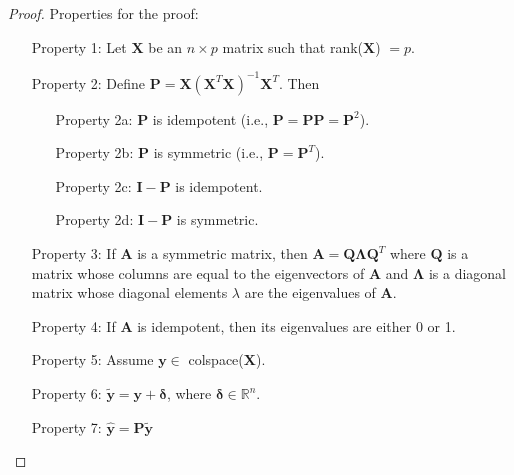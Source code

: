 \documentclass{umassthesis}          %
\begin{document}
\begin{proof}
Properties for the proof:
\begin{enumerate}
\item[Property 1:] Let $\boldsymbol{X}$ be an $n \times p$ matrix such that rank($\boldsymbol{X}$) $= p$.
\item[Property 2:] Define $\boldsymbol{P} = \boldsymbol{X}(\boldsymbol{X}^T\boldsymbol{X})^{-1}\boldsymbol{X}^T$. Then
\begin{enumerate}
\item[Property 2a:] $\boldsymbol{P}$ is idempotent (i.e., $\boldsymbol{P} = \boldsymbol{P} \boldsymbol{P} = \boldsymbol{P}^2$).
\item[Property 2b:] $\boldsymbol{P}$ is symmetric (i.e., $\boldsymbol{P} = \boldsymbol{P}^T$).
\item[Property 2c:] $\boldsymbol{I-P}$ is idempotent.
\item[Property 2d:] $\boldsymbol{I-P}$ is symmetric.
\end{enumerate}
\item[Property 3:] If $\boldsymbol{A}$ is a symmetric matrix, then $\boldsymbol{A} = \boldsymbol{Q} \boldsymbol{\Lambda} \boldsymbol{Q}^T$ where $\boldsymbol{Q}$ is a matrix whose columns are equal to the eigenvectors of $\boldsymbol{A}$ and $\boldsymbol{\Lambda}$ is a diagonal matrix whose diagonal elements $\lambda$ are the eigenvalues of $\boldsymbol{A}$.
\item[Property 4:] If $\boldsymbol{A}$ is idempotent, then its eigenvalues are either 0 or 1.
\item[Property 5:] Assume $\bm{y} \in $ colspace($\boldsymbol{X}$).
\item[Property 6:] $\tilde{\bm{y}} = \bm{y} + \bm{\delta}$, where $\bm{\delta} \in \mathbb{R}^n$.
\item[Property 7:] $\hat{\bm{y}} = \boldsymbol{P}\tilde{\bm{y}}$
\end{enumerate}


\end{proof}
\end{document}
